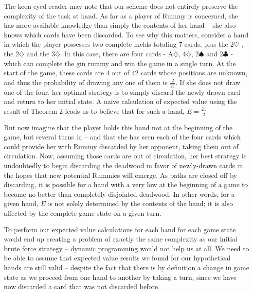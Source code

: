 \documentclass[letter,12pt]{article}
\begin{document}
The keen-eyed reader may note that our scheme does not entirely preserve the complexity of the task at hand. As far as a player of Rummy is concerned, she has more available knowledge than simply the contents of her hand – she also knows which cards have been discarded. To see why this matters, consider a hand in which the player possesses two complete melds totaling 7 cards, plus the 2$\heartsuit$ , the 2$\diamondsuit$ and the 3$\diamondsuit$. In this case, there are four cards - A$\diamondsuit$, 4$\diamondsuit$, 2$\spadesuit$ and 2$\clubsuit$ - which can complete the gin rummy and win the game in a single turn. At the start of the game, these cards are 4 out of 42 cards whose positions are unknown, and thus the probability of drawing any one of them is $\frac{2}{21}$. If she does not draw one of the four, her optimal strategy is to simply discard the newly-drawn card and return to her initial state. A naive calculation of expected value using the result of Theorem 2 leads us to believe that for such a hand, $E=\frac{21}{2}$
 
 But now imagine that the player holds this hand not at the beginning of the game, but several turns in – and that she has seen each of the four cards which could provide her with Rummy discarded by her opponent, taking them out of circulation. Now, assuming those cards are out of circulation, her best strategy is undoubtedly to begin discarding the deadwood in favor of newly-drawn cards in the hopes that new potential Rummies will emerge. As paths are closed off by discarding, it is possible for a hand with a very low  at the beginning of a game to become no better than completely disjointed deadwood. In other words, for a given hand, $E$ is not solely determined by the contents of the hand; it is also affected by the complete game state on a given turn. 
 
 To perform our expected value calculations for each hand for each game state would end up creating a problem of exactly the same complexity as our initial brute force strategy – dynamic programming would not help us at all. We need to be able to assume that expected value results we found for our hypothetical hands are still valid – despite the fact that there is by definition a change in game state as we proceed from one hand to another by taking a turn, since we have now discarded a card that was not discarded before. 
\end{document}
